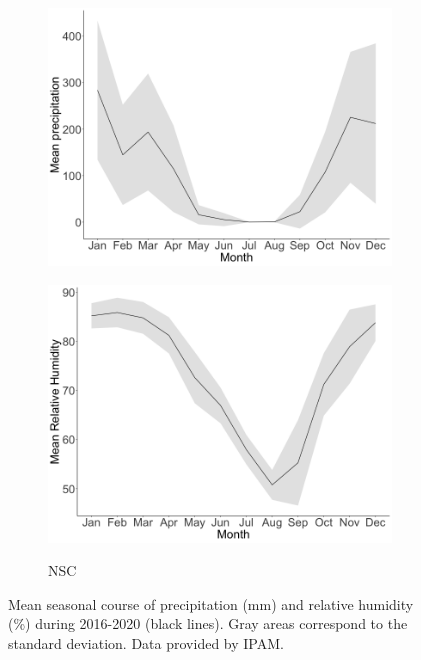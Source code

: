 \documentclass{article}
\begin{document}
\begin{figure}[h] %
   \centering
   \begin{subfigure}{0.50\textwidth}
   \includegraphics[width=\textwidth]{precipitation_seasonality.png} 
   	\caption{}
          \label{fig:precipitation} 
       \end{subfigure}
	 \begin{subfigure}{0.48\textwidth}
   \includegraphics[width=\textwidth]{Relative_humidity_seasonality.png} 
   	\caption{}
          	\label{fig:Relative_humidity} NSC
	\end{subfigure}
   \caption{Mean seasonal course of precipitation (mm) and relative humidity (\%) during 2016-2020 (black lines). Gray areas correspond to the standard deviation. Data provided by IPAM. }
   \label{fig:climatic_seasonality}
\end{figure}	
\end{document}
